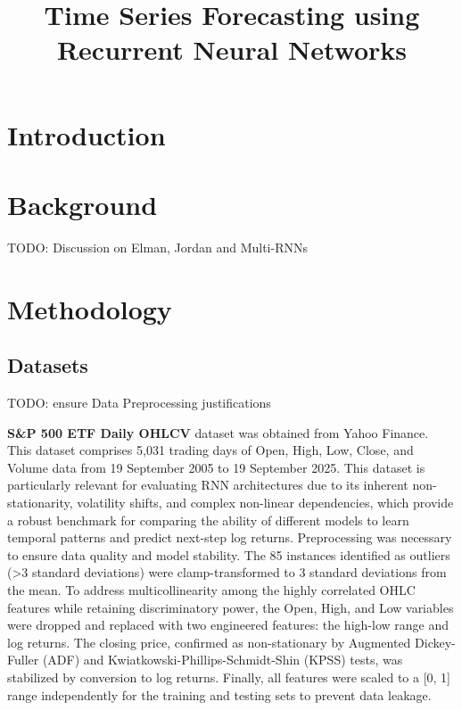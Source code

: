 \documentclass[conference, 10pt]{IEEEtran}
\begin{document}
\title{Time Series Forecasting using Recurrent Neural Networks}

\author{
}

\maketitle

\begin{abstract}

\end{abstract}

\begin{IEEEkeywords}

\end{IEEEkeywords}

\section{Introduction}



\section{Background}
TODO: Discussion on Elman, Jordan and Multi-RNNs


\section{Methodology}
\subsection{Datasets}
TODO: ensure Data Preprocessing justifications

\textbf{S\&P 500 ETF Daily OHLCV} dataset was obtained from Yahoo Finance. This dataset comprises 5,031 trading days of
Open, High, Low, Close, and Volume data from 19 September 2005 to 19 September 2025. This dataset is particularly
relevant for evaluating RNN architectures due to its inherent non-stationarity, volatility
shifts, and complex non-linear dependencies, which provide a robust benchmark for comparing the ability of different
models to learn temporal patterns and predict next-step log returns. Preprocessing was necessary to ensure data quality
and model stability. The 85 instances identified as outliers (>3 standard deviations) were clamp-transformed to 3
standard deviations from the mean. To address multicollinearity among the highly correlated OHLC features while
retaining discriminatory power, the Open, High, and Low variables were dropped and replaced with two engineered
features: the high-low range and log returns. The closing price, confirmed as non-stationary by Augmented Dickey-Fuller
(ADF) and Kwiatkowski-Phillips-Schmidt-Shin (KPSS) tests, was stabilized by conversion to log returns. Finally, all
features were scaled to a [0, 1] range independently for the training and testing sets to prevent data leakage.
\end{document}
